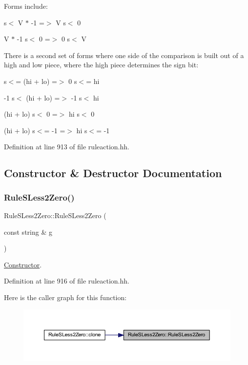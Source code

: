 Forms include\+:
\begin{DoxyItemize}
\item { s$<$ V $\ast$ -\/1 =$>$ V s$<$ 0}
\item {\ttfamily V $\ast$ -\/1 s$<$ 0 =$>$ 0 s$<$ V}
\end{DoxyItemize}

There is a second set of forms where one side of the comparison is built out of a high and low piece, where the high piece determines the sign bit\+:
\begin{DoxyItemize}
\item { s$<$= (hi + lo) =$>$ 0 s$<$= hi}
\item {\ttfamily -\/1 s$<$ (hi + lo) =$>$ -\/1 s$<$ hi}
\item {\ttfamily (hi + lo) s$<$ 0 =$>$ hi s$<$ 0}
\item {\ttfamily (hi + lo) s$<$= -\/1 =$>$ hi s$<$= -\/1} 
\end{DoxyItemize}

Definition at line 913 of file ruleaction.\+hh.



\subsection{Constructor \& Destructor Documentation}
\mbox{\label{class_rule_s_less2_zero_a3afea061db07773a60bdbb0e74520ace}} 
\subsubsection{\texorpdfstring{RuleSLess2Zero()}{RuleSLess2Zero()}}
{\footnotesize\ttfamily Rule\+S\+Less2\+Zero\+::\+Rule\+S\+Less2\+Zero (\begin{DoxyParamCaption}\item[{const string \&}]{g }\end{DoxyParamCaption})\hspace{0.3cm}{\ttfamily [inline]}}



\mbox{\hyperlink{class_constructor}{Constructor}}. 



Definition at line 916 of file ruleaction.\+hh.

Here is the caller graph for this function\+:
\nopagebreak
\begin{figure}[H]
\begin{center}
\leavevmode
\includegraphics[width=350pt]{class_rule_s_less2_zero_a3afea061db07773a60bdbb0e74520ace_icgraph}
\end{center}
\end{figure}


